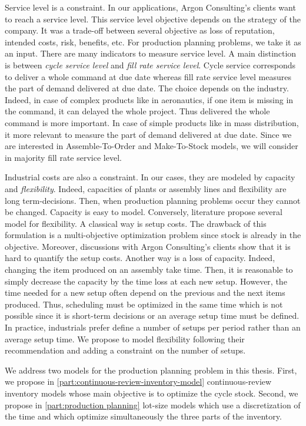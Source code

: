 Service level is a constraint.
In our applications, Argon Consulting's clients want to reach a service level.
This service level objective depends on the strategy of the company.
It was a trade-off between several objective as loss of reputation, intended costs, risk, benefits, etc.
For production planning problems, we take it as an input.
There are many indicators to measure service level.
A main distinction is between \emph{cycle service level} and \emph{fill rate service level}.
Cycle service corresponds to deliver a whole command at due date whereas fill rate service level measures the part of demand delivered at due date.
The choice depends on the industry.
Indeed, in case of complex products like in aeronautics, if one item is missing in the command, it can delayed the whole project.
Thus delivered the whole command is more important.
In case of simple products like in mass distribution, it more relevant to measure the part of demand delivered at due date.
Since we are interested in Assemble-To-Order and Make-To-Stock models, we will consider in majority fill rate service level.


Industrial costs are also a constraint.
In our cases, they are modeled by capacity and \emph{flexibility}.
Indeed, capacities of plants or assembly lines and flexibility are long term-decisions.
Then, when production planning problems occur they cannot be changed.
Capacity is easy to model.
Conversely, literature propose several model for flexibility.
A classical way is setup costs.
The drawback of this formulation is a multi-objective optimization problem since stock is already in the objective.
Moreover, discussions with Argon Consulting's clients show that it is hard to quantify the setup costs.
Another way is a loss of capacity.
Indeed, changing the item produced on an assembly take time.
Then, it is reasonable to simply decrease the capacity by the time loss at each new setup.
However, the time needed for a new setup often depend on the previous and the next items produced.
Thus, scheduling must be optimized in the same time which is not possible since it is short-term decisions or an average setup time must be defined.
In practice, industrials prefer define a number of setups per period rather than an average setup time.
We propose to model flexibility following their recommendation and adding a constraint on the number of setups.


\medskip


We address two models for the production planning problem in this thesis.
First, we propose in \cref{part:continuous-review-inventory-model} continuous-review inventory models whose main objective is to optimize the cycle stock.
Second, we propose in \cref{part:production planning} lot-size models which use a discretization of the time and which optimize simultaneously the three parts of the inventory.



